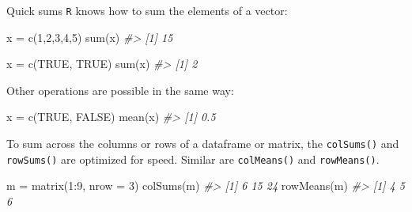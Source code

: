 \documentclass[
  11pt,
  ignorenonframetext,
  svgnames, handout, t]{beamer}
\newenvironment{Shaded}{\begin{snugshade}}{\end{snugshade}}
\newcommand{\AttributeTok}[1]{\textcolor[rgb]{0.77,0.63,0.00}{#1}}
\newcommand{\CommentTok}[1]{\textcolor[rgb]{0.56,0.35,0.01}{\textit{#1}}}
\newcommand{\ConstantTok}[1]{\textcolor[rgb]{0.00,0.00,0.00}{#1}}
\newcommand{\DecValTok}[1]{\textcolor[rgb]{0.00,0.00,0.81}{#1}}
\newcommand{\FunctionTok}[1]{\textcolor[rgb]{0.00,0.00,0.00}{#1}}
\newcommand{\NormalTok}[1]{#1}
\newcommand{\OtherTok}[1]{\textcolor[rgb]{0.56,0.35,0.01}{#1}}
\newcommand{\SpecialCharTok}[1]{\textcolor[rgb]{0.00,0.00,0.00}{#1}}
\begin{document}
\begin{frame}[fragile]{Quick sums}
\protect\hypertarget{quick-sums}{}
\texttt{R} knows how to sum the elements of a vector:

\footnotesize

\begin{Shaded}
\begin{Highlighting}[]
\NormalTok{x }\OtherTok{=} \FunctionTok{c}\NormalTok{(}\DecValTok{1}\NormalTok{,}\DecValTok{2}\NormalTok{,}\DecValTok{3}\NormalTok{,}\DecValTok{4}\NormalTok{,}\DecValTok{5}\NormalTok{)}
\FunctionTok{sum}\NormalTok{(x)}
\CommentTok{\#\textgreater{} [1] 15}

\NormalTok{x }\OtherTok{=} \FunctionTok{c}\NormalTok{(}\ConstantTok{TRUE}\NormalTok{, }\ConstantTok{TRUE}\NormalTok{)}
\FunctionTok{sum}\NormalTok{(x)}
\CommentTok{\#\textgreater{} [1] 2}
\end{Highlighting}
\end{Shaded}

\normalsize

Other operations are possible in the same way:

\footnotesize

\begin{Shaded}
\begin{Highlighting}[]
\NormalTok{x }\OtherTok{=} \FunctionTok{c}\NormalTok{(}\ConstantTok{TRUE}\NormalTok{, }\ConstantTok{FALSE}\NormalTok{)}
\FunctionTok{mean}\NormalTok{(x)}
\CommentTok{\#\textgreater{} [1] 0.5}
\end{Highlighting}
\end{Shaded}

\normalsize

To sum across the columns or rows of a dataframe or matrix, the
\texttt{colSums()} and \texttt{rowSums()} are optimized for speed.
Similar are \texttt{colMeans()} and \texttt{rowMeans()}.

\footnotesize

\begin{Shaded}
\begin{Highlighting}[]
\NormalTok{m }\OtherTok{=} \FunctionTok{matrix}\NormalTok{(}\DecValTok{1}\SpecialCharTok{:}\DecValTok{9}\NormalTok{, }\AttributeTok{nrow =} \DecValTok{3}\NormalTok{)}
\FunctionTok{colSums}\NormalTok{(m)}
\CommentTok{\#\textgreater{} [1]  6 15 24}
\FunctionTok{rowMeans}\NormalTok{(m)}
\CommentTok{\#\textgreater{} [1] 4 5 6}
\end{Highlighting}
\end{Shaded}

\normalsize
\end{frame}
\end{document}
